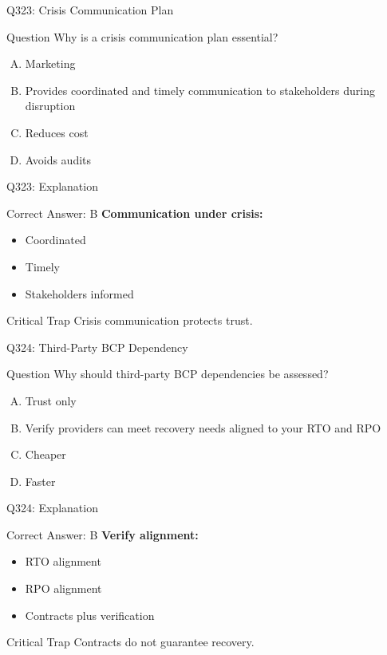 \documentclass{beamer}
\begin{document}
	\begin{frame}{Q323: Crisis Communication Plan}
		\begin{block}{Question}
			Why is a crisis communication plan essential?
		\end{block}
		\begin{enumerate}[(A)]
			\item Marketing
			\item Provides coordinated and timely communication to stakeholders during disruption
			\item Reduces cost
			\item Avoids audits
		\end{enumerate}
	\end{frame}
	
	\begin{frame}{Q323: Explanation}
		\begin{block}{Correct Answer: B}
			\textbf{Communication under crisis:}
			\begin{itemize}
				\item Coordinated
				\item Timely
				\item Stakeholders informed
			\end{itemize}
		\end{block}
		\begin{alertblock}{Critical Trap}
			Crisis communication protects trust.
		\end{alertblock}
	\end{frame}
	
	\begin{frame}{Q324: Third-Party BCP Dependency}
		\begin{block}{Question}
			Why should third-party BCP dependencies be assessed?
		\end{block}
		\begin{enumerate}[(A)]
			\item Trust only
			\item Verify providers can meet recovery needs aligned to your RTO and RPO
			\item Cheaper
			\item Faster
		\end{enumerate}
	\end{frame}
	
	\begin{frame}{Q324: Explanation}
		\begin{block}{Correct Answer: B}
			\textbf{Verify alignment:}
			\begin{itemize}
				\item RTO alignment
				\item RPO alignment
				\item Contracts plus verification
			\end{itemize}
		\end{block}
		\begin{alertblock}{Critical Trap}
			Contracts do not guarantee recovery.
		\end{alertblock}
	\end{frame}
	
\end{document}
